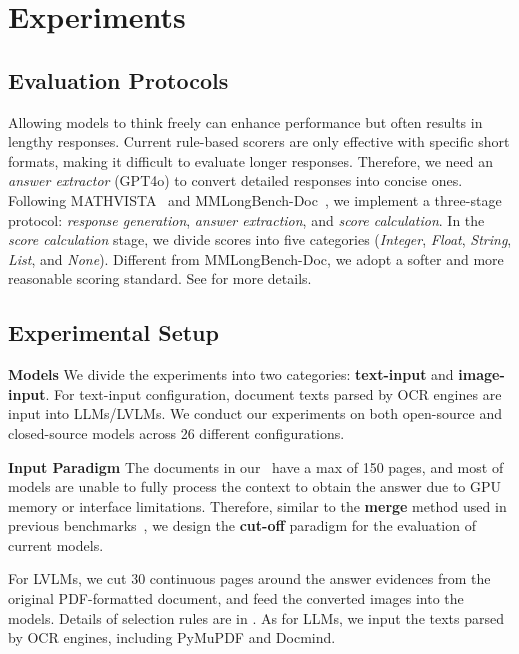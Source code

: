 \section{Experiments}
\label{sec: experiments}

\subsection{Evaluation Protocols}
\label{subsec: evaluation_protocols}
Allowing models to think freely can enhance performance but often results in lengthy responses. 
Current rule-based scorers are only effective with specific short formats, making it difficult to evaluate longer responses. Therefore, we need an \emph{answer extractor} (GPT4o) to convert detailed responses into concise ones. Following MATHVISTA~\cite{MATHVISTA} and MMLongBench-Doc~\cite{MMLongBench-Doc}, we implement a three-stage protocol: \emph{response generation}, \emph{answer extraction}, and \emph{score calculation}. In the \emph{score calculation} stage, we divide scores into five categories (\emph{Integer}, \emph{Float}, \emph{String}, \emph{List}, and \emph{None}). Different from MMLongBench-Doc, we adopt a softer and more reasonable scoring standard. See  for more details.

\subsection{Experimental Setup}
\label{subsec: experimental_setup}
\textbf{Models} We divide the experiments into two categories: \textbf{text-input} and \textbf{image-input}. For text-input configuration, document texts parsed by OCR engines are input into LLMs/LVLMs.
We conduct our experiments on both open-source and closed-source
models across 26 different configurations.

\noindent\textbf{Input Paradigm}
The documents in our \benchName~have a max of 150 pages, and most of models are unable to fully process the context to obtain the answer due to GPU memory or interface limitations. Therefore, similar to the \textbf{merge} method used in previous benchmarks~\cite{MMLongBench-Doc}, we design the \textbf{cut-off} paradigm for the evaluation of current models.

For LVLMs, we cut 30 continuous pages around the answer evidences from the original PDF-formatted document, and feed the converted images into the models. 
Details of selection rules are in .
As for LLMs, we input the texts parsed by OCR engines, including PyMuPDF and Docmind.

